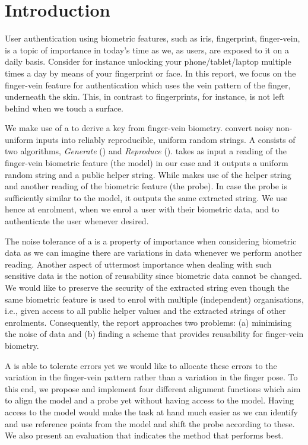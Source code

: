 \section{Introduction}

User authentication using biometric features, such as iris, fingerprint, finger-vein, is a topic of importance in today's time as we, as users, are exposed to it on a daily basis. Consider for instance unlocking your phone/tablet/laptop multiple times a day by means of your fingerprint or face. 
In this report, we focus on the finger-vein feature for authentication which uses the vein pattern of the finger, underneath the skin. This, in contrast to fingerprints, for instance, is not left behind when we touch a surface.

We make use of a \fe to derive a key from finger-vein biometry. \fes convert noisy non-uniform inputs into reliably reproducible, uniform random strings. 
A \fe consists of two algorithms, \textit{Generate} (\gen) and \textit{Reproduce} (\rep).
\gen takes as input a reading of the finger-vein biometric feature (the model) in our case and it outputs a uniform random string and a public helper string. While
\rep makes use of the helper string and another reading of the biometric feature (the probe). In case the probe is sufficiently similar to the model, it outputs the same extracted string. 
We use \gen hence at enrolment, when we enrol a user with their biometric data, and \rep to authenticate the user whenever desired.


The noise tolerance of a \fe is a property of importance when considering biometric data as we can imagine there are variations in data whenever we perform another reading. 
Another aspect of uttermost importance when dealing with such sensitive data is the notion of reusability since biometric data cannot be changed. We would like to preserve the security of the extracted string even though the same biometric feature is used to enrol with multiple (independent) organisations, i.e., given access to all public helper values and the extracted strings of other enrolments.  
Consequently, the report approaches two problems: (a)
minimising the noise of data and (b) finding a \fe scheme that provides reusability for finger-vein biometry.

A \fe is able to tolerate errors yet we would like to allocate these errors to the variation in the finger-vein pattern rather than a variation in the finger pose.
To this end, we propose and implement four different alignment functions which aim to align the model and a probe yet without having access to the model. Having access to the model would make the task at hand much easier as we can identify and use reference points from the model and shift the probe according to these. 
We also present an evaluation that indicates the method that performs best.

